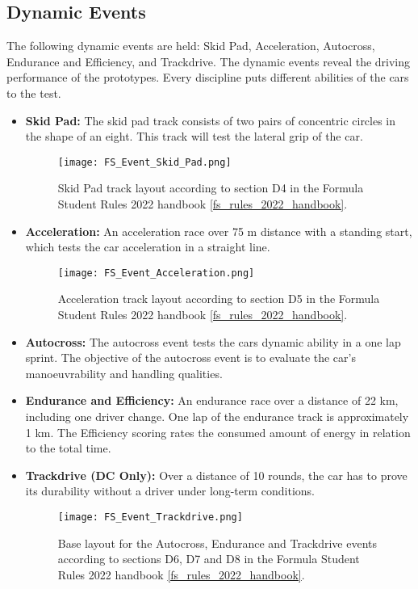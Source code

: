 \subsection{Dynamic Events}
The following dynamic events are held: Skid Pad, Acceleration, Autocross, Endurance and Efficiency, and Trackdrive.
The dynamic events reveal the driving performance of the prototypes. Every discipline puts different abilities of the cars to the test. \cite{fs_rules_2022_handbook}
\begin{itemize}
    \item \textbf{Skid Pad:} The skid pad track consists of two pairs of concentric circles in the shape of an eight. This track will test the lateral grip of the car.
    \begin{figure}[H]
        \centering
        \texttt{[image: FS\_Event\_Skid\_Pad.png]}
        \caption{Skid Pad track layout according to section D4 in the Formula Student Rules 2022 handbook \ref{fs_rules_2022_handbook}.}
        \label{fig:FS Skid Pad layout}
    \end{figure}
    \item \textbf{Acceleration:} An acceleration race over 75 m distance with a standing start, which tests the car acceleration in a straight line.
    \begin{figure}[H]
        \centering
        \texttt{[image: FS\_Event\_Acceleration.png]}
        \caption{Acceleration track layout according to section D5 in the Formula Student Rules 2022 handbook \ref{fs_rules_2022_handbook}.}
        \label{fig:FS Acceleration layout}
    \end{figure}
    \item \textbf{Autocross:} The autocross event tests the cars dynamic ability in a one lap sprint. The objective of the autocross event is to evaluate the car's manoeuvrability and handling qualities.
    \item \textbf{Endurance and Efficiency:} An endurance race over a distance of 22 km, including one driver change. One lap of the endurance track is approximately 1 km. The Efficiency scoring rates the consumed amount of energy in relation to the total time.
    \item \textbf{Trackdrive (DC Only):}  Over a distance of 10 rounds, the car has to prove its durability without a driver under long-term conditions.
    \begin{figure}[H]
        \centering
        \texttt{[image: FS\_Event\_Trackdrive.png]}
        \caption{Base layout for the Autocross, Endurance and Trackdrive events according to sections D6, D7 and D8 in the Formula Student Rules 2022 handbook \ref{fs_rules_2022_handbook}.}
        \label{fig:FS Autocross, Endurance and Trackdrive layout}
    \end{figure}
\end{itemize}

